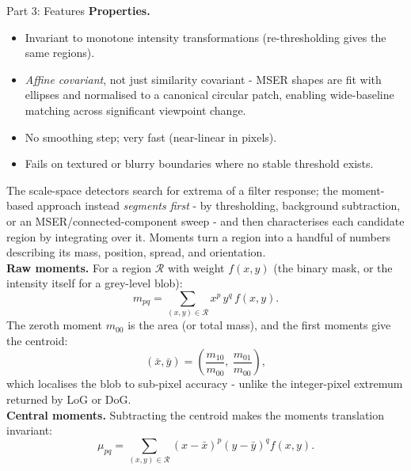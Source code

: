 \documentclass[letterpaper]{article}
\begin{document}
\begin{notes}{Part 3: Features}
\textbf{Properties.}
\begin{itemize}
    \item Invariant to monotone intensity transformations (re-thresholding gives the same regions).
    \item \emph{Affine covariant}, not just similarity covariant - MSER shapes are fit with ellipses and normalised to a canonical circular patch, enabling wide-baseline matching across significant viewpoint change.
    \item No smoothing step; very fast (near-linear in pixels).
    \item Fails on textured or blurry boundaries where no stable threshold exists.
\end{itemize}


The scale-space detectors search for extrema of a filter response; the moment-based approach instead \emph{segments first} - by thresholding, background subtraction, or an MSER/connected-component sweep - and then characterises each candidate region by integrating over it. Moments turn a region into a handful of numbers describing its mass, position, spread, and orientation.\\

\textbf{Raw moments.} For a region $\mathcal{R}$ with weight $f(x,y)$ (the binary mask, or the intensity itself for a grey-level blob):
$$m_{pq} = \sum_{(x,y)\in\mathcal{R}} x^p\,y^q\,f(x,y).$$
The zeroth moment $m_{00}$ is the area (or total mass), and the first moments give the centroid:
$$(\bar x, \bar y) = \left(\frac{m_{10}}{m_{00}},\ \frac{m_{01}}{m_{00}}\right),$$
which localises the blob to sub-pixel accuracy - unlike the integer-pixel extremum returned by LoG or DoG.\\

\textbf{Central moments.} Subtracting the centroid makes the moments translation invariant:
$$\mu_{pq} = \sum_{(x,y)\in\mathcal{R}} (x-\bar x)^p (y-\bar y)^q f(x,y).$$


\end{notes}
\end{document}
